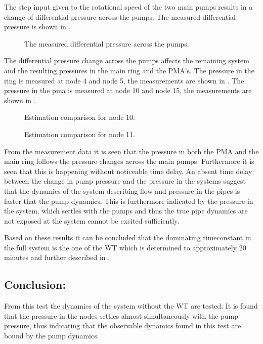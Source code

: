 The step input given to the rotational speed of the two main pumps results in a change of differential pressure across the pumps. The measured differential pressure is shown in . 

\begin{figure}[H]

\caption{The measured differential pressure across the pumps.}
\label{fig:Test_pipe_pumpdiff}
\end{figure}

The differential pressure change across the pumps affects the remaining system and the resulting pressures in the main ring and the PMA's.
The pressure in the ring is measured at node 4 and node 5, the measurements are shown in . 
The pressure in the pma is measured at node 10 and node 15, the measurements are shown in .   

\begin{figure}[H]
  \centering
  \begin{minipage}[b]{0.45\textwidth}
  
    \caption{Estimation comparison for node 10.}
    \label{fig:Test_pipe_ring}
  \end{minipage}
  \hfill
  \begin{minipage}[b]{0.45\textwidth}
    
    \caption{Estimation comparison for node 11.}
    \label{fig:Test_pipe_pma}
  \end{minipage}
\end{figure}

From the measurement data it is seen that the pressure in both the PMA and the main ring follows the pressure changes across the main pumps. Furthermore it is seen that this is happening without noticeable time delay. An absent time delay between the change in pump pressure and the pressure in the systems suggest that the dynamics of the system describing flow and pressure in the pipes is faster that the pump dynamics. This is furthermore indicated by the pressure in the system, which settles with the pumps and thus the true pipe dynamics are not exposed at the system cannot be excited sufficiently.

Based on these results it can be concluded that the dominating timeconstant in the full system is the one of the WT which is determined to approximately 20 minutes and further described in .       

\subsection*{Conclusion:}
From this test the dynamics of the system without the WT are tested. It is found that the pressure in the nodes settles almost simultaneously with the pump pressure, thus indicating that the observable dynamics found in this test are bound by the pump dynamics.   